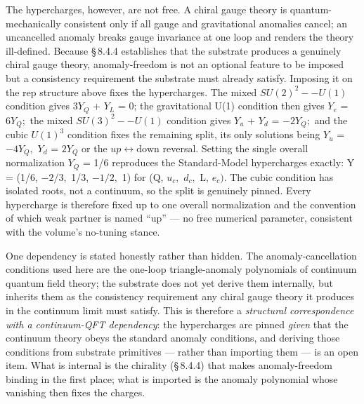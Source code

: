 \documentclass[11pt,oneside]{report}
\theoremstyle{definition}
\theoremstyle{remark}
\begin{document}
The hypercharges, however, are not free. A chiral gauge theory is
quantum-mechanically consistent only if all gauge and gravitational
anomalies cancel; an uncancelled anomaly breaks gauge invariance at one
loop and renders the theory ill-defined. Because \S\,8.4.4 establishes that
the substrate produces a genuinely chiral gauge theory, anomaly-freedom
is not an optional feature to be imposed but a consistency requirement
the substrate must already satisfy. Imposing it on the rep structure
above fixes the hypercharges. The mixed \ensuremath{SU(2)^{2}--U(1)} condition gives
\ensuremath{3Y_{Q}} + \ensuremath{Y_{L}} = 0; the gravitational U(1) condition then gives \ensuremath{Y_{e}} =
\ensuremath{6Y_{Q};} the mixed \ensuremath{SU(3)^{2}--U(1)} condition gives \ensuremath{Y_{u}} + \ensuremath{Y_{d}} = \ensuremath{-2Y_{Q};} and
the cubic \ensuremath{U(1)^{3}} condition fixes the remaining split, its only solutions
being \ensuremath{Y_{u}} = \ensuremath{-4Y_{Q},} \ensuremath{Y_{d}} = \ensuremath{2Y_{Q}} or the \ensuremath{up\leftrightarrow \text{down}} reversal. Setting the
single overall normalization \ensuremath{Y_{Q}} = 1/6 reproduces the Standard-Model
hypercharges exactly: Y = (1/6, \ensuremath{-2/3,} 1/3, \ensuremath{-1/2,} 1) for (Q, \ensuremath{u_{c},} \ensuremath{d_{c},} L,
\ensuremath{e_{c}).} The cubic condition has isolated roots, not a continuum, so the
split is genuinely pinned. Every hypercharge is therefore fixed up to
one overall normalization and the convention of which weak partner is
named ``up'' --- no free numerical parameter, consistent with the
volume's no-tuning stance.

One dependency is stated honestly rather than hidden. The anomaly-cancellation
conditions used here are the one-loop triangle-anomaly polynomials of continuum
quantum field theory; the substrate does not yet derive them internally, but
inherits them as the consistency requirement any chiral gauge theory it produces
in the continuum limit must satisfy. This is therefore a \emph{structural
correspondence with a continuum-QFT dependency}: the hypercharges are pinned
\emph{given} that the continuum theory obeys the standard anomaly conditions, and
deriving those conditions from substrate primitives --- rather than importing
them --- is an open item. What is internal is the chirality (\S\,8.4.4) that makes
anomaly-freedom binding in the first place; what is imported is the anomaly
polynomial whose vanishing then fixes the charges.
\end{document}
